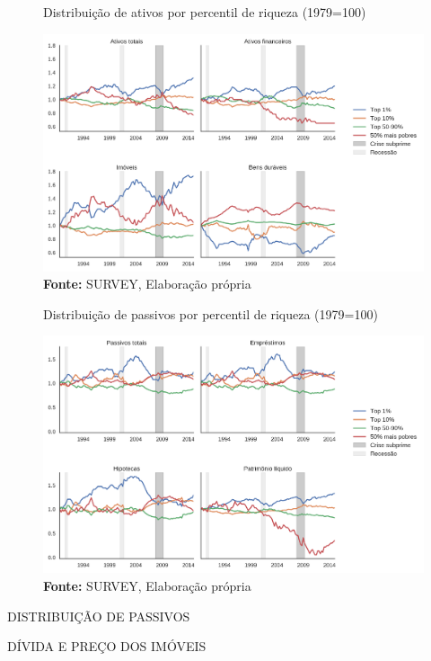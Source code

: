 \begin{figure}[htb]
	\centering
	\caption{Distribuição de ativos por percentil de riqueza (1979=100)}
	\label{FigDistAtivos}
	\includegraphics[width=\textwidth]{../../Dados/Fatos_Estilizados/figs/Distribuicao_Ativos.png}
	\caption*{\textbf{Fonte:} SURVEY, Elaboração própria}
\end{figure}


\begin{figure}[htb]
	\centering
	\caption{Distribuição de passivos por percentil de riqueza (1979=100)}
	\label{FigDistPassivos}
	\includegraphics[width=\textwidth]{../../Dados/Fatos_Estilizados/figs/Distribuicao_Passivos.png}
	\caption*{\textbf{Fonte:} SURVEY, Elaboração própria}
\end{figure}


DISTRIBUIÇÃO DE PASSIVOS

DÍVIDA E PREÇO DOS IMÓVEIS


